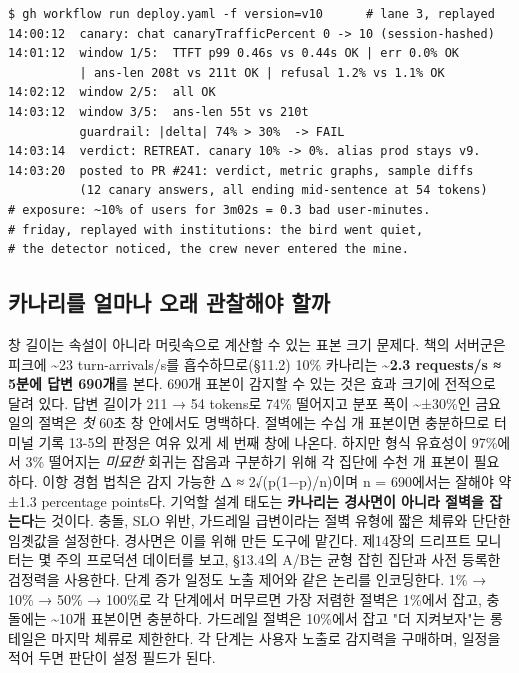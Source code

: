 \begin{terminalbox}
\begin{Verbatim}[breaklines=true,breakanywhere=true,fontsize=\small,formatcom=\color{tbbtermfg},codes=\tbbcodeactive]
$ gh workflow run deploy.yaml -f version=v10      # lane 3, replayed
14:00:12  canary: chat canaryTrafficPercent 0 -> 10 (session-hashed)
14:01:12  window 1/5:  TTFT p99 0.46s vs 0.44s OK | err 0.0% OK
          | ans-len 208t vs 211t OK | refusal 1.2% vs 1.1% OK
14:02:12  window 2/5:  all OK
14:03:12  window 3/5:  ans-len 55t vs 210t
          guardrail: |delta| 74% > 30%  -> FAIL
14:03:14  verdict: RETREAT. canary 10% -> 0%. alias prod stays v9.
14:03:20  posted to PR #241: verdict, metric graphs, sample diffs
          (12 canary answers, all ending mid-sentence at 54 tokens)
# exposure: ~10% of users for 3m02s = 0.3 bad user-minutes.
# friday, replayed with institutions: the bird went quiet,
# the detector noticed, the crew never entered the mine.
\end{Verbatim}
\end{terminalbox}

\subsection*{카나리를 얼마나 오래 관찰해야 할까}

창 길이는 속설이 아니라 머릿속으로 계산할 수 있는 표본 크기 문제다. 책의 서버군은 피크에 \textasciitilde{}23 turn-arrivals/s를 흡수하므로(§11.2) 10\% 카나리는 \textbf{\textasciitilde{}2.3 requests/s ≈ 5분에 답변 690개}를 본다. 690개 표본이 감지할 수 있는 것은 효과 크기에 전적으로 달려 있다. 답변 길이가 211 → 54 tokens로 74\% 떨어지고 분포 폭이 \textasciitilde{}±30\%인 금요일의 절벽은 \textit{첫} 60초 창 안에서도 명백하다. 절벽에는 수십 개 표본이면 충분하므로 터미널 기록 13-5의 판정은 여유 있게 세 번째 창에 나온다. 하지만 형식 유효성이 97\%에서 3\% 떨어지는 \textit{미묘한} 회귀는 잡음과 구분하기 위해 각 집단에 수천 개 표본이 필요하다. 이항 경험 법칙은 감지 가능한 Δ ≈ 2√(p(1−p)/n)이며 n = 690에서는 잘해야 약 ±1.3 percentage points다. 기억할 설계 태도는 \textbf{카나리는 경사면이 아니라 절벽을 잡는다}는 것이다. 충돌, SLO 위반, 가드레일 급변이라는 절벽 유형에 짧은 체류와 단단한 임곗값을 설정한다. 경사면은 이를 위해 만든 도구에 맡긴다. 제14장의 드리프트 모니터는 몇 주의 프로덕션 데이터를 보고, §13.4의 A/B는 균형 잡힌 집단과 사전 등록한 검정력을 사용한다. 단계 증가 일정도 노출 제어와 같은 논리를 인코딩한다. 1\% → 10\% → 50\% → 100\%로 각 단계에서 머무르면 가장 저렴한 절벽은 1\%에서 잡고, 충돌에는 \textasciitilde{}10개 표본이면 충분하다. 가드레일 절벽은 10\%에서 잡고 "더 지켜보자"는 롱테일은 마지막 체류로 제한한다. 각 단계는 사용자 노출로 감지력을 구매하며, 일정을 적어 두면 판단이 설정 필드가 된다.

